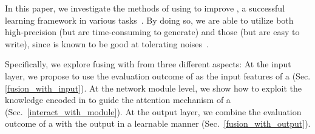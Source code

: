 
In this paper,
we investigate the methods of using \RE to improve \NN, a successful learning framework in various \NLP tasks~\cite{goldberg2017neural}. 
By doing so,  %
we are able to utilize both high-precision \REs (but are time-consuming to generate) and those  (but are easy to write), %
since \NN is known to be good at
tolerating noises~\cite{xie2016disturblabel}.




Specifically, we explore fusing \RE with \NN from three different aspects:
At the input layer, we propose to use the evaluation outcome of
\REs as the input features of a \NN (Sec.\ref{fusion_with_input}).
At the network module level, we show how to
exploit the knowledge encoded in \REs to guide the attention mechanism of a \NN (Sec.~\ref{interact_with_module}). At the output layer, we
combine the evaluation outcome of a \RE with the \NN output in a learnable manner (Sec.~\ref{fusion_with_output}).

